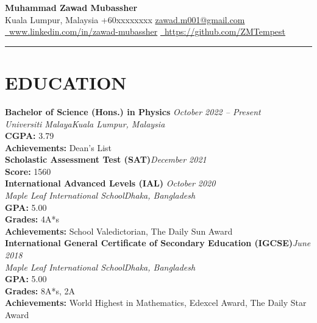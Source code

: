 \documentclass[10pt,a4paper]{article}
\begin{document}
\begin{center}
    {\Huge \bfseries Muhammad Zawad Mubassher}\vspace{6pt}\\
    {\small
    Kuala Lumpur, Malaysia \textbullet{} +60xxxxxxxx \textbullet{} \href{mailto:zawad.m001@gmail.com}{zawad.m001@gmail.com}\\
    \href{https://www.linkedin.com/in/zawad-mubassher/}{\, www.linkedin.com/in/zawad-mubassher} \quad \href{https://github.com/ZMTempest}{\, https://github.com/ZMTempest}
    }
    \rule{\linewidth}{0.5mm}
\end{center}

\section*{EDUCATION}
\noindent\textbf{Bachelor of Science (Hons.) in Physics }\hfill\textit{October 2022 -- Present}\\
\noindent\textit{Universiti Malaya}\hfill \textit{Kuala Lumpur, Malaysia}\\
\noindent\textbf{CGPA:} 3.79\\
\noindent\textbf{Achievements:} Dean's List \\

\noindent\textbf{Scholastic Assessment Test (SAT)}\hfill\textit{December 2021}\\
\noindent\textbf{Score:} 1560\\

\noindent\textbf{International Advanced Levels (IAL) }\hfill \textit{October 2020}\\
\noindent\textit{Maple Leaf International School}\hfill \textit{Dhaka, Bangladesh}\\
\noindent\textbf{GPA:} 5.00\\
\noindent\textbf{Grades:} 4A*s\\
\noindent\textbf{Achievements:} School Valedictorian, The Daily Sun Award\\

\noindent\textbf{International General Certificate of Secondary Education (IGCSE)}\hfill \textit{June 2018}\\
\noindent\textit{Maple Leaf International School}\hfill \textit{Dhaka, Bangladesh}\\
\noindent\textbf{GPA:} 5.00\\
\noindent\textbf{Grades:} 8A*s, 2A\\
\noindent\textbf{Achievements:} World Highest in Mathematics, Edexcel Award, The Daily Star Award\\
\end{document}
